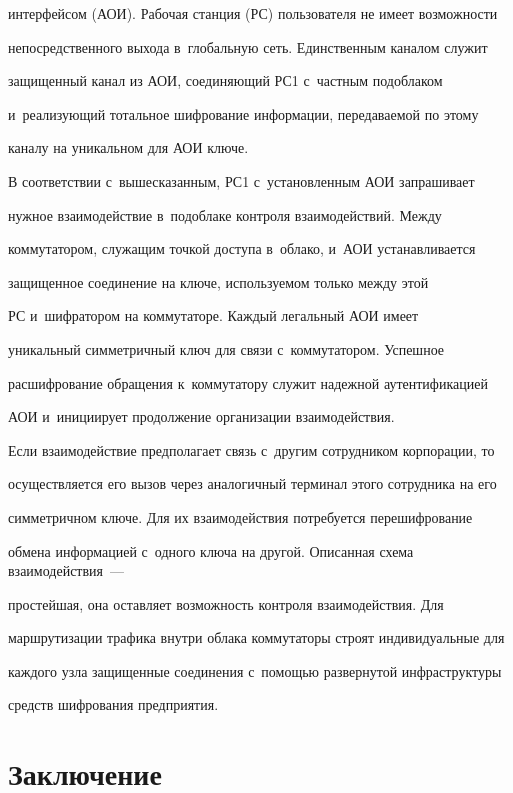 {{интерфейсом} (АОИ). Рабочая станция (РС) пользователя не имеет возможности 


непосредственного выхода в~глобальную сеть. Единственным каналом служит 


защищенный канал из АОИ, соединяющий РС1 с~частным подоблаком 


и~реализующий тотальное шифрование информации, передаваемой по этому 


каналу на уникальном для АОИ ключе. 


  


  В соответствии с~вышесказанным, РС1 с~установленным АОИ запрашивает 


нужное взаимодействие в~подоблаке контроля взаимодействий. Между 


коммутатором, служащим точкой доступа в~облако, и~АОИ устанавливается 


защищенное соединение на ключе, используемом только между этой 


РС и~шифратором на коммутаторе. Каждый легальный АОИ имеет 


уникальный симметричный ключ для связи с~коммутатором. Успешное 


расшифрование обращения к~коммутатору служит надежной аутентификацией 


АОИ и~инициирует продолжение организации взаимодействия.


  


  Если взаимодействие предполагает связь с~другим сотрудником корпорации, то 


осуществляется его вызов через аналогичный терминал этого сотрудника на его 


симметричном ключе. Для их взаимодействия потребуется перешифрование 


обмена информацией с~одного ключа на другой. Описанная схема взаимодействия~--- 


простейшая, она оставляет возможность контроля взаимодействия. Для 


маршрутизации трафика внутри облака коммутаторы строят индивидуальные для 


каждого узла защищенные соединения с~помощью развернутой инфраструктуры 


средств шифрования предприятия.


 


  \section{Заключение }


}
